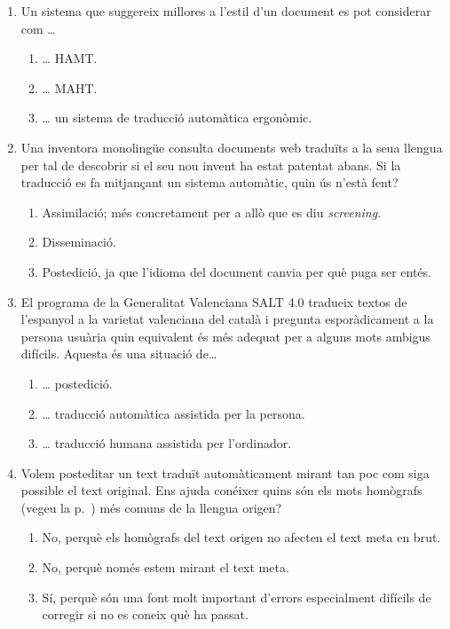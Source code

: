 \begin{enumerate}
\item Un sistema que suggereix millores a l'estil d'un document es pot
  considerar com {\ldots}
  \begin{enumerate}
  \item {\ldots} HAMT.
  \item {\ldots} MAHT.
  \item {\ldots} un sistema de traducció automàtica ergonòmic.
\end{enumerate}

\item Una inventora monolingüe consulta documents web traduïts a la
  seua llengua per tal de descobrir si el seu nou invent ha estat
  patentat abans. Si la traducció es fa mitjançant un sistema
  automàtic, quin ús n'està fent?
  \begin{enumerate}
  \item Assimilació; més concretament per a allò que es diu
    \emph{screening}.
  \item Disseminació.
  \item Postedició, ja que l'idioma del document canvia per què puga
    ser entés.
\end{enumerate}

\item El programa de la Generalitat Valenciana SALT 4.0 tradueix
  textos de l'espanyol a la varietat valenciana del català i pregunta
  esporàdicament a la persona usuària quin equivalent és més adequat
  per a alguns mots ambigus difícils.  Aquesta és una situació
  de{\ldots}
  \begin{enumerate}
  \item {\ldots} postedició.
  \item {\ldots} traducció automàtica assistida per la persona.
  \item {\ldots} traducció humana assistida per l'ordinador.
  \end{enumerate}

\item Volem posteditar un text traduït automàticament mirant tan poc
  com siga possible el text original. Ens ajuda conéixer quins són els
  mots homògrafs (vegeu la p.~\pageref{pg:homografia}) més comuns de
  la llengua origen?
  \begin{enumerate}
  \item No, perquè els homògrafs del text origen no afecten el text
    meta en brut.
  \item No, perquè només estem mirant el text meta.
  \item Sí, perquè són una font molt important d'errors especialment
    difícils de corregir si no es coneix què ha passat.
  \end{enumerate}


\end{enumerate}
